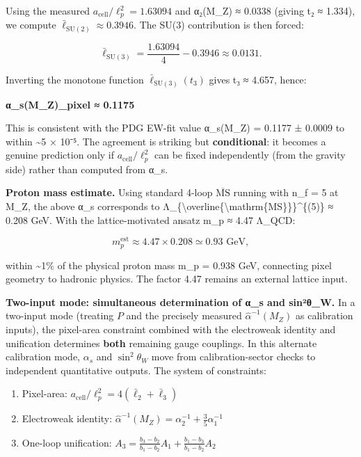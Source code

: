 Using the measured \(a_{\mathrm{cell}}/\ell_p^2 = 1.63094\) and α₂(M\_Z) ≈ 0.0338 (giving t₂ ≈ 1.334), we compute \(\bar{\ell}_{\mathrm{SU}(2)} ≈ 0.3946\). The SU(3) contribution is then forced:

\[
\bar{\ell}_{\mathrm{SU}(3)} = \frac{1.63094}{4} - 0.3946 \approx 0.0131.
\]

Inverting the monotone function \(\bar{\ell}_{\mathrm{SU}(3)}(t_3)\) gives t₃ ≈ 4.657, hence:

\textbf{α\_s(M\_Z)\textbar\_pixel ≈ 0.1175}

This is consistent with the PDG EW-fit value α\_s(M\_Z) = 0.1177 ± 0.0009 to within \textasciitilde5 × 10⁻⁵. The agreement is striking but \textbf{conditional}: it becomes a genuine prediction only if \(a_{\mathrm{cell}}/\ell_p^2\) can be fixed independently (from the gravity side) rather than computed from α\_s.

\textbf{Proton mass estimate.} Using standard 4-loop \(\overline{\mathrm{MS}}\) running with n\_f = 5 at M\_Z, the above α\_s corresponds to Λ\_\{\textbackslash overline\{\textbackslash mathrm\{MS\}\}\}\^{}\{(5)\} ≈ 0.208 GeV. With the lattice-motivated ansatz m\_p ≈ 4.47 Λ\_QCD:

\[
m_p^{\mathrm{est}} \approx 4.47 \times 0.208 \simeq 0.93 \text{ GeV},
\]

within \textasciitilde1\% of the physical proton mass m\_p = 0.938 GeV, connecting pixel geometry to hadronic physics. The factor 4.47 remains an external lattice input.

\textbf{Two-input mode: simultaneous determination of α\_s and sin²θ\_W.} In a two-input mode (treating $P$ and the precisely measured $\hat{\alpha}^{-1}(M_Z)$ as calibration inputs), the pixel-area constraint combined with the electroweak identity and unification determines \textbf{both} remaining gauge couplings. In this alternate calibration mode, $\alpha_s$ and $\sin^2\theta_W$ move from calibration-sector checks to independent quantitative outputs. The system of constraints:

\begin{enumerate}
\def\labelenumi{\arabic{enumi}.}
\tightlist
\item
  Pixel-area: \(a_{\mathrm{cell}}/\ell_p^2 = 4(\bar{\ell}_2 + \bar{\ell}_3)\)
\item
  Electroweak identity: \(\hat{\alpha}^{-1}(M_Z) = \alpha_2^{-1} + \frac{3}{5}\alpha_1^{-1}\)
\item
  One-loop unification: \(A_3 = \frac{b_3-b_2}{b_1-b_2}A_1 + \frac{b_1-b_3}{b_1-b_2}A_2\)
\end{enumerate}

